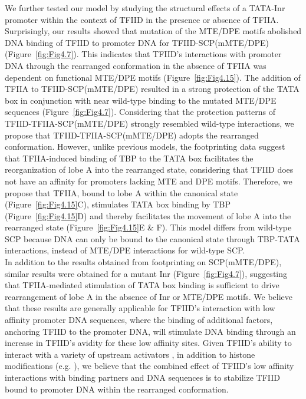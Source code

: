 We further tested our model by studying the structural effects of a TATA-Inr promoter within the context of TFIID in the presence or absence of TFIIA. Surprisingly, our results showed that mutation of the MTE/DPE motifs abolished DNA binding of TFIID to promoter DNA for TFIID-SCP(mMTE/DPE) (Figure~\ref{fig:Fig4.7}). This indicates that TFIID's interactions with promoter DNA through the rearranged conformation in the absence of TFIIA was dependent on functional MTE/DPE motifs (Figure~\ref{fig:Fig4.15}). The addition of TFIIA to TFIID-SCP(mMTE/DPE) resulted in a strong protection of the TATA box in conjunction with near wild-type binding to the mutated MTE/DPE sequences (Figure~\ref{fig:Fig4.7}). Considering that the protection patterns of TFIID-TFIIA-SCP(mMTE/DPE) strongly resembled wild-type interactions, we propose that TFIID-TFIIA-SCP(mMTE/DPE) adopts the rearranged conformation. However, unlike previous models, the footprinting data suggest that TFIIA-induced binding of TBP to the TATA box facilitates the reorganization of lobe A into the rearranged state, considering that TFIID does not have an affinity for promoters lacking MTE and DPE motifs. Therefore, we propose that TFIIA, bound to lobe A within the canonical state (Figure~\ref{fig:Fig4.15}C), stimulates TATA box binding by TBP (Figure~\ref{fig:Fig4.15}D) and thereby facilitates the movement of lobe A into the rearranged state (Figure~\ref{fig:Fig4.15}E \& F). This model differs from wild-type SCP because DNA can only be bound to the canonical state through TBP-TATA interactions, instead of MTE/DPE interactions for wild-type SCP. \\
\indent In addition to the results obtained from footprinting on SCP(mMTE/DPE), similar results were obtained for a mutant Inr (Figure~\ref{fig:Fig4.7}), suggesting that TFIIA-mediated stimulation of TATA box binding is sufficient to drive rearrangement of lobe A in the absence of Inr or MTE/DPE motifs. We believe that these results are generally applicable for TFIID's interaction with low affinity promoter DNA sequences, where the binding of additional factors, anchoring TFIID to the promoter DNA, will stimulate DNA binding through an increase in TFIID's avidity for these low affinity sites. Given TFIID's ability to interact with a variety of upstream activators \cite{Goodrich_503,Levine_1710}, in addition to histone modifications (e.g. \cite{Jacobson_2000,Vermeulen_2007}), we believe that the combined effect of TFIID's low affinity interactions with binding partners and DNA sequences is to stabilize TFIID bound to promoter DNA within the rearranged conformation.\\

